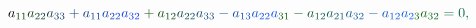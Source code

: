 \documentclass[12pt]{article}
\begin{document}
\begin{displaymath}
{a} _ { \mathcolor[RGB]{15,60,0}{1} \mathcolor[RGB]{15,60,15}{1} } \mathcolor[RGB]{15,60,30}{a} _ { \mathcolor[RGB]{15,60,45}{2} \mathcolor[RGB]{15,60,60}{2} } \mathcolor[RGB]{15,60,75}{a} _ { \mathcolor[RGB]{15,60,90}{3} \mathcolor[RGB]{15,60,105}{3} } \mathcolor[RGB]{15,60,120}{+} \mathcolor[RGB]{15,60,135}{a} _ { \mathcolor[RGB]{15,60,150}{1} \mathcolor[RGB]{15,60,165}{1} } \mathcolor[RGB]{15,60,180}{a} _ { \mathcolor[RGB]{15,60,195}{2} \mathcolor[RGB]{15,60,210}{2} } \mathcolor[RGB]{15,60,225}{a} _ { \mathcolor[RGB]{15,60,240}{3} \mathcolor[RGB]{15,60,255}{2} } \mathcolor[RGB]{15,75,0}{+} \mathcolor[RGB]{15,75,15}{a} _ { \mathcolor[RGB]{15,75,30}{1} \mathcolor[RGB]{15,75,45}{2} } \mathcolor[RGB]{15,75,60}{a} _ { \mathcolor[RGB]{15,75,75}{2} \mathcolor[RGB]{15,75,90}{2} } \mathcolor[RGB]{15,75,105}{a} _ { \mathcolor[RGB]{15,75,120}{3} \mathcolor[RGB]{15,75,135}{3} } \mathcolor[RGB]{15,75,150}{-} \mathcolor[RGB]{15,75,165}{a} _ { \mathcolor[RGB]{15,75,180}{1} \mathcolor[RGB]{15,75,195}{3} } \mathcolor[RGB]{15,75,210}{a} _ { \mathcolor[RGB]{15,75,225}{2} \mathcolor[RGB]{15,75,240}{2} } \mathcolor[RGB]{15,75,255}{a} _ { \mathcolor[RGB]{15,90,0}{3} \mathcolor[RGB]{15,90,15}{1} } \mathcolor[RGB]{15,90,30}{-} \mathcolor[RGB]{15,90,45}{a} _ { \mathcolor[RGB]{15,90,60}{1} \mathcolor[RGB]{15,90,75}{2} } \mathcolor[RGB]{15,90,90}{a} _ { \mathcolor[RGB]{15,90,105}{2} \mathcolor[RGB]{15,90,120}{1} } \mathcolor[RGB]{15,90,135}{a} _ { \mathcolor[RGB]{15,90,150}{3} \mathcolor[RGB]{15,90,165}{2} } \mathcolor[RGB]{15,90,180}{-} \mathcolor[RGB]{15,90,195}{a} _ { \mathcolor[RGB]{15,90,210}{1} \mathcolor[RGB]{15,90,225}{2} } \mathcolor[RGB]{15,90,240}{a} _ { \mathcolor[RGB]{15,90,255}{2} \mathcolor[RGB]{15,105,0}{3} } \mathcolor[RGB]{15,105,15}{a} _ { \mathcolor[RGB]{15,105,30}{3} \mathcolor[RGB]{15,105,45}{2} } \mathcolor[RGB]{15,105,60}{=} \mathcolor[RGB]{15,105,75}{0} \mathcolor[RGB]{15,105,90}{,} \,
\end{displaymath}
\end{document}
